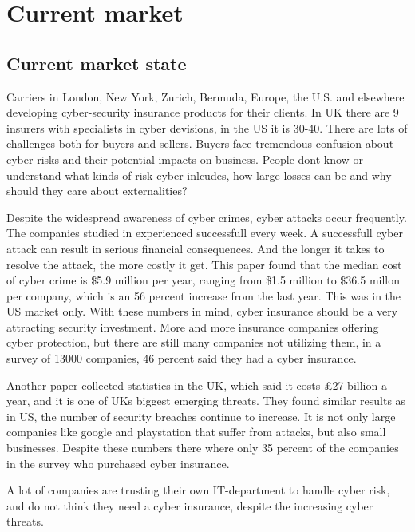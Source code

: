 \chapter{Current market}
\label{chp:hvahardenneaasi??} 
\section{Current market state}
Carriers in London, New York, Zurich, Bermuda, Europe, the U.S. and 
elsewhere developing cyber-security insurance products for their clients.
In UK there are 9 insurers with specialists in cyber devisions, 
in the US it is 30-40. \cite{evolvingcyber}
There are lots of challenges both for buyers and sellers. 
Buyers face tremendous confusion about cyber risks and their potential impacts on business. 
People dont know or understand what kinds of risk cyber inlcudes, 
how large losses can be and why should they care about externalities?
\cite{Cyberworkshop}

Despite the widespread awareness of cyber crimes, cyber attacks occur frequently. 
The companies studied in \cite{ccost} experienced successfull every week.
 A successfull cyber attack can result in serious financial consequences. 
 And the longer it takes to resolve the attack, the more costly it get. 
 This paper found that the median cost of cyber crime is \$5.9 million per year, 
 ranging from \$1.5 million to \$36.5 millon per company, 
 which is an 56 percent increase from the last year. This was in the US market only. 
 With these numbers in mind, cyber insurance should be a very attracting security investment. 
 More and more insurance companies offering cyber protection,
  but there are still many companies not utilizing them, in a survey of 13000 companies, 
  46 percent said they had a cyber insurance. \cite{compworld} 

Another paper \cite{evolvingcyber} collected statistics in the UK, which said it costs \pounds 27
 billion a year, and it is one of UKs biggest emerging threats. They found similar results as in US,
  the number of security breaches continue to increase.  It is not only large companies like google
   and playstation that suffer from attacks, but also small businesses. Despite these numbers
    there where only 35 percent of the companies in the survey who purchased cyber insurance. 

A lot of companies are trusting their own IT-department to handle cyber risk, 
and do not think they need a cyber insurance, despite the increasing cyber threats. \cite{twatson}

